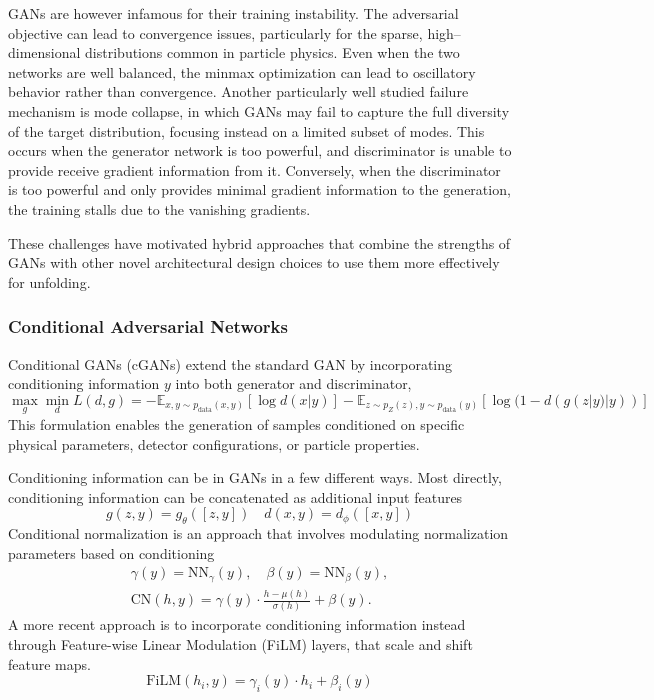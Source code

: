         GANs are however infamous for their training instability.
        The adversarial objective can lead to convergence issues, particularly for the sparse, high--dimensional distributions common in particle physics.
        Even when the two networks are well balanced, the minmax optimization can lead to oscillatory behavior rather than convergence.
        Another particularly well studied failure mechanism is mode collapse, in which GANs may fail to capture the full diversity of the target distribution, focusing instead on a limited subset of modes.
        This occurs when the generator network is too powerful, and discriminator is unable to provide receive gradient information from it.
        Conversely, when the discriminator is too powerful and only provides minimal gradient information to the generation, the training stalls due to the vanishing gradients.
        
        These challenges have motivated hybrid approaches that combine the strengths of GANs with other novel architectural design choices to use them more effectively for unfolding.
    \subsubsection{Conditional Adversarial Networks}
        Conditional GANs (cGANs) extend the standard GAN by incorporating conditioning information \(y\) into both generator and discriminator,
        \begin{equation}
            \max_g \min_d L(d, g) = -\mathbb{E}_{x,y \sim p_{\text{data}}(x,y)}[\log d(x|y)] - \mathbb{E}_{z \sim p_Z(z), y \sim p_{\text{data}}(y)}[\log(1 - d(g(z|y)|y))]
        \end{equation}
        This formulation enables the generation of samples conditioned on specific physical parameters, detector configurations, or particle properties.
        
        Conditioning information can be in GANs in a few different ways.
        Most directly, conditioning information can be concatenated as additional input features
        \begin{equation}
             g(z,y) = g_{\theta}([z,y])\quad d(x,y) = d_{\phi}([x,y])
        \end{equation}
        Conditional normalization is an approach that involves modulating normalization parameters based on conditioning
        \begin{gather}
            \gamma(y) = \text{NN}_{\gamma}(y),\quad\beta(y) = \text{NN}_{\beta}(y),\\
            \text{CN}(h,y) = \gamma(y) \cdot \frac{h - \mu(h)}{\sigma(h)} + \beta(y).
        \end{gather}
        A more recent approach is to incorporate conditioning information instead through Feature-wise Linear Modulation (FiLM) layers, that scale and shift feature maps.
        \begin{equation}
            \text{FiLM}(h_i,y) = \gamma_i(y) \cdot h_i + \beta_i(y)
        \end{equation}

